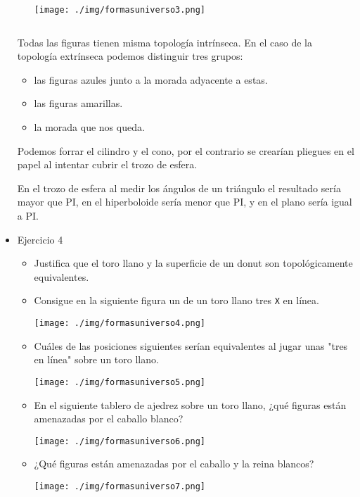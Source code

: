 \documentclass[11pt]{article}
\begin{document}
\begin{itemize}
\begin{statement}
\begin{itemize}
\texttt{[image: ./img/formasuniverso3.png]}
\end{itemize}

$\quad$
\end{statement}

Todas las figuras tienen misma topología intrínseca. En el caso de la
topología extrínseca podemos distinguir tres grupos:

\begin{itemize}
\item las figuras azules junto a la morada adyacente a estas.
\item las figuras amarillas.
\item la morada que nos queda.
\end{itemize}

Podemos forrar el cilindro y el cono, por el contrario se crearían
pliegues en el papel al intentar cubrir el trozo de esfera.

En el trozo de esfera al medir los ángulos de un triángulo el
resultado sería mayor que PI, en el hiperboloide sería menor que PI, y
en el plano sería igual a PI.

\item Ejercicio 4
\label{sec-5-3-1-4}
\begin{statement}
\begin{itemize}
\item Justifica que el toro llano y la superficie de un donut son
topológicamente equivalentes.

\item Consigue en la siguiente figura un de un toro llano tres \texttt{X}
    en línea.

\texttt{[image: ./img/formasuniverso4.png]}

\item Cuáles de las posiciones siguientes serían equivalentes al jugar
unas "tres en línea" sobre un toro llano.

\texttt{[image: ./img/formasuniverso5.png]}

\item En el siguiente tablero de ajedrez sobre un toro llano, ¿qué figuras
están amenazadas por el caballo blanco?

\texttt{[image: ./img/formasuniverso6.png]}

\item ¿Qué figuras están amenazadas por el caballo y la reina blancos?

\texttt{[image: ./img/formasuniverso7.png]}


\end{itemize}
\end{statement}
\end{itemize}
\end{document}
